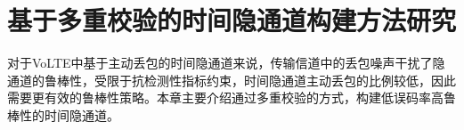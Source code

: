 \chapter{基于多重校验的时间隐通道构建方法研究}
\label{chap:hash}

对于VoLTE中基于主动丢包的时间隐通道来说，传输信道中的丢包噪声干扰了隐通道的鲁棒性，受限于抗检测性指标约束，时间隐通道主动丢包的比例较低，因此需要更有效的鲁棒性策略。本章主要介绍通过多重校验的方式，构建低误码率高鲁棒性的时间隐通道。






